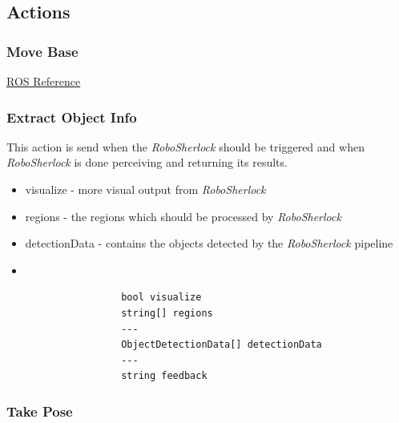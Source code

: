 \documentclass[main.tex]{subfiles}
\begin{document}
				\subsection{Actions}
				\label{actions}
					\subsubsection{Move Base}
					\label{msg_move_base}
						\href{http://wiki.ros.org/move_base_msgs/MoveBaseAction}{ROS Reference}
					\subsubsection{Extract Object Info}
					\label{msg_extract_object_info}
						This action is send when the \textit{RoboSherlock} should be triggered and when \textit{RoboSherlock} is done perceiving and returning its results.
					\begin{itemize}
						\item visualize - more visual output from \textit{RoboSherlock}
						\item regions - the regions which should be processed by \textit{RoboSherlock}
						\item detectionData - contains the objects detected by the \textit{RoboSherlock} pipeline
						\item
					\end{itemize}
					\begin{lstlisting}
					bool visualize
					string[] regions
					---
					ObjectDetectionData[] detectionData
					---
					string feedback
					\end{lstlisting}
					\subsubsection{Take Pose}
					\label{msg_take_pose}
\end{document}
